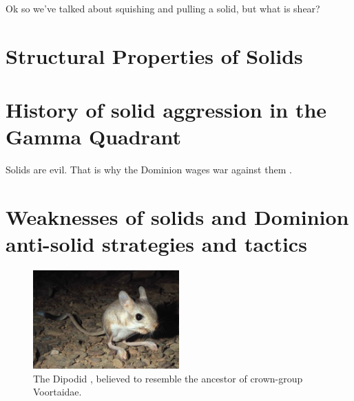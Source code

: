 Ok so we've talked about squishing and pulling a solid, but what is shear?

\section{Structural Properties of Solids}



\section{History of solid aggression in the Gamma Quadrant}
Solids are evil. That is why the Dominion  wages war against them \citep{Son-of-Moog:2488}.
\section{Weaknesses of solids and Dominion anti-solid strategies and tactics}
\begin{figure}[h!]
 \label{jaculus}
 \centering
  \includegraphics[width=0.5\textwidth]{ch-solids/figures/jaculus.jpg}
 \caption{The Dipodid , believed to resemble the ancestor of crown-group Voortaidae.}
\end{figure}




